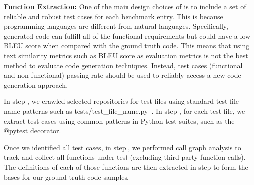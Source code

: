 
\textbf{Function Extraction:} One of the main design choices of \tool is to include a set of reliable and robust test cases for each benchmark entry. This is because programming languages are different from natural languages. Specifically, generated code can fulfill all of the functional requirements but could have a low BLEU score when compared with the ground truth code\cite{tran2019does}. This means that using text similarity metrics such as BLEU score as evaluation metrics is not the best method to evaluate code generation techniques. Instead, test cases (functional and non-functional) passing rate should be used to reliably access a new code generation approach.

In step , we crawled selected repositories for test files using standard test file name patterns such as tests/test\_file\_name.py~\cite{madeja2021automating}. In step , for each test file, we extract test cases using common patterns in Python test suites, such as the @pytest decorator.

Once we identified all test cases, in step , we performed call graph analysis to track and collect all functions under test (excluding third-party function calls). The definitions of each of those functions are then extracted in step  to form the bases for our ground-truth code samples.



